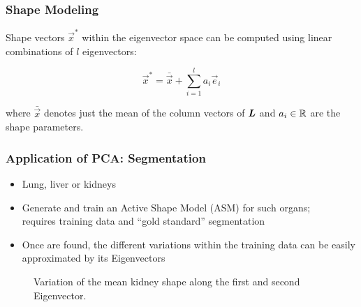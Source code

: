 	\begin{frame}
		\frametitle{Shape Modeling \cont}

		Shape vectors $\vec x^*$ within the eigenvector space can be computed using linear combinations of $l$ eigenvectors:

		\begin{displaymath}
			\vec x^* = \bar{\vec x} + \sum_{i=1}^l a_i \vec e_i
		\end{displaymath}

		where $\bar{\vec x}$ denotes just the mean of the column vectors of ${\bm L}$ and $a_i\in \mathbb{R}$ are the shape parameters.
	\end{frame}


	\begin{frame}
		\frametitle{Application of PCA: Segmentation}

		\begin{itemize}
			\item Lung, liver or kidneys
			\item Generate and train an Active Shape Model (ASM) for such organs; \\
			      requires training data and ``gold standard'' segmentation
			\item Once  are found, the different variations within the training data can be easily approximated by its Eigenvectors
		\end{itemize}

\begin{figure}
\caption{Variation of the mean kidney shape along the first and second Eigenvector.}
  \end{figure}

	\end{frame}


